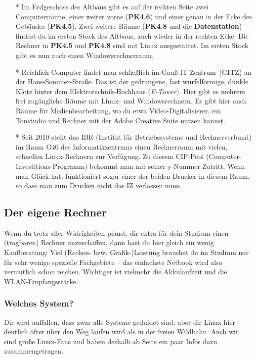 			\begin{itemize}
				\item[*] Im Erdgeschoss des Altbaus gibt es auf der rechten Seite zwei Computerräume, einer weiter vorne (\textbf{PK4.6}) und einer genau in der Ecke des Gebäudes (\textbf{PK4.5}). Zwei weitere Räume (\textbf{PK4.8} und die \textbf{Datenstation}) findest du im ersten Stock des Altbaus, auch wieder in der rechten Ecke. Die Rechner in \textbf{PK4.5} und \textbf{PK4.8} sind mit Linux ausgestattet. Im ersten Stock gibt es nun auch einen Windowsrechnerraum.

				\item[*] Reichlich Computer findet man schließlich im Gauß-IT-Zentrum~(GITZ) an der Hans-Sommer-Straße. Das ist der gedrungene, fast würfelförmige, dunkle Klotz hinter dem Elektrotechnik-Hochhaus (\emph{E-Tower}). Hier gibt es mehrere frei zugängliche Räume mit Linux- und Windowsrechnern. Es gibt hier auch Räume für Medienbearbeitung, wo du etwa Video-Digitalisierer, ein Tonstudio und Rechner mit der Adobe Creative Suite nutzen kannst.

				\item[*] Seit 2010 stellt das IBR (Institut für Betriebssysteme und Rechnerverbund) im Raum G40 des Informatikzentrums einen Rechnerraum mit vielen, schnellen Linux-Rechnern  zur Verfügung. Zu diesem CIP-Pool (Computer-Investitions-Programm) bekommt man mit seiner y-Nummer Zutritt. Wenn man Glück hat, funktioniert sogar einer der beiden Drucker in diesem Raum, so dass man zum Drucken nicht das IZ verlassen muss.
			\end{itemize}

		\subsection{Der eigene Rechner}
			Wenn du trotz aller Widrigkeiten planst, dir extra für dein Studium einen (tragbaren) Rechner anzuschaffen, dann hast du hier gleich ein wenig Kaufberatung: Viel (Rechen- bzw. Grafik-)Leistung brauchst du im Studium  nur für sehr wenige spezielle Fachgebiete -- das einfachste Netbook wird also vermutlich schon reichen. Wichtiger ist vielmehr die Akkulaufzeit und die WLAN-Empfangsstärke.

		\subsubsection{Welches System?}
			Dir wird auffallen, dass zwar alle Systeme geduldet sind, aber dir Linux hier deutlich öfter über den Weg laufen wird als in der freien Wildbahn. Auch wir sind große Linux-Fans und haben deshalb ab Seite \pageref{linux} ein paar Infos dazu zusammengetragen.

